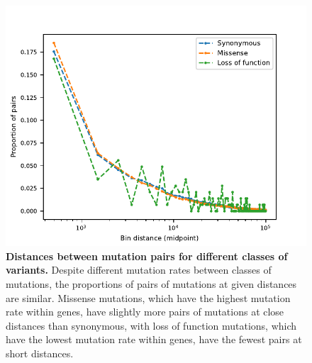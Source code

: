 \documentclass[]{article}
\begin{document}
\begin{figure}[ht!]
    \centering
    \includegraphics{../figures/mutation_class_distances}
    \caption{
        \textbf{Distances between mutation pairs for different classes of variants.}
        Despite different mutation rates between classes of mutations, the
        proportions of pairs of mutations at given distances are similar.
        Missense mutations, which have the highest mutation rate within genes,
        have slightly more pairs of mutations at close distances than synonymous,
        with loss of function mutations, which have the lowest mutation rate within
        genes, have the fewest pairs at short distances.
    }
    \label{fig:mutDistances}
\end{figure}
\end{document}
